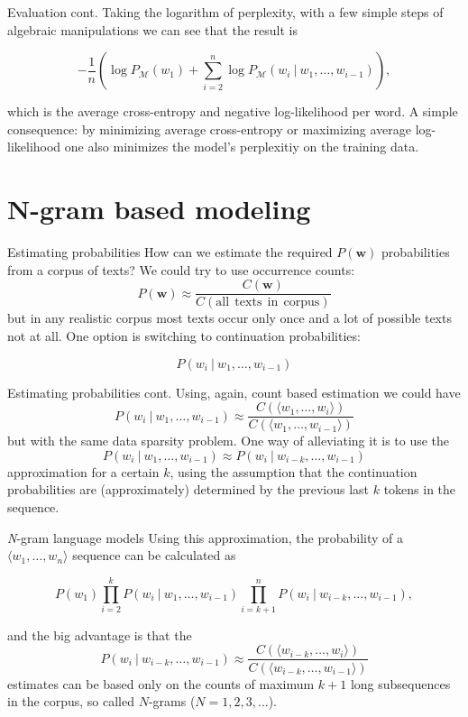 \documentclass[style=upen, size=14pt]{powerdot}
\theoremstyle{definition}
\begin{document}
\begin{slide}[toc=]{Evaluation cont.}
  Taking the logarithm of perplexity, with a few simple steps of algebraic
  manipulations we can see that the result is

  $$
  - \frac{1}{n} \left(\log P_{\mathcal M}(w_1) + \sum_{i=2}^n\log P_{\mathcal M}(w_i ~\vert~ w_1,\dots, w_{i-1})\right),
$$

which is the average cross-entropy and negative log-likelihood per word. A
simple consequence: by minimizing average cross-entropy or maximizing average
log-likelihood one also minimizes the model's perplexitiy on the training data.
\end{slide}

\section{N-gram based modeling}

\begin{slide}[toc=Estimating probabilities]{Estimating  probabilities}
  How can we estimate the required $P(\mathbf{w})$ probabilities from a corpus
  of texts? We could try to use occurrence counts:
  $$
  P(\mathbf{w}) \approx \frac{C(\mathbf{w})}{C(\mathrm{all~~texts~~in~~corpus})}
  $$
  but in any realistic corpus most texts occur only once and a lot of possible
  texts not at all. One option is switching to continuation probabilities: 
  
  $$
  P(w_{i} ~\vert~ w_1,\dots,w_{i-1})
  $$
\end{slide}

\begin{slide}[toc=]{Estimating  probabilities cont.}
  Using, again, count based estimation we could have
  $$
  P(w_{i} ~\vert~ w_1,\dots,w_{i-1}) \approx
  \frac{C(\langle w_1,\dots,w_{i} \rangle)}{C(\langle w_1,\dots,w_{i-1} \rangle
    )}
  $$
  but with the same data sparsity problem. One way of alleviating it is to use
  the
  $$
  P(w_{i} ~\vert~ w_1,\dots,w_{i-1}) \approx P(w_{i} ~\vert~
  w_{i-k},\dots,w_{i-1})
  $$
  approximation for a certain $k$, using the assumption that the continuation
  probabilities are (approximately) determined by the previous last $k$ tokens
  in the sequence.
\end{slide}

\begin{slide}[toc=\emph{N}-grams]{\emph{N}-gram language models}
  Using this approximation, the probability of a $\langle w_1,\dots,w_n \rangle$
  sequence can be calculated as
  \begin{small}
  $$
  P(w_1) \prod_{i=2}^k P(w_{i} ~\vert~ w_{1},\dots,w_{i-1})  \prod_{i=k+1}^n P(w_{i} ~\vert~ w_{i-k},\dots,w_{i-1}),
  $$
\end{small}
and the big advantage is that the
  $$
  P(w_{i} ~\vert~ w_{i-k},\dots,w_{i-1}) \approx
\frac{C(\langle w_{i-k},\dots,w_{i}\rangle)}{C(\langle w_{i-k},\dots,w_{i-1} \rangle)}
  $$
  estimates can be based only on the counts of maximum $k+1$ long subsequences
  in the corpus, so called $N$-grams ($N=1, 2, 3,\dots$).
\end{slide}
\end{document}
